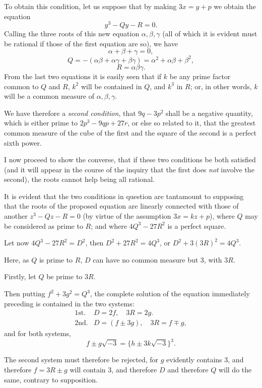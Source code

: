 \documentclass[11pt]{article}
\newcommand{\sourcepage}[1]{\marginpar{\scriptsize p.~#1}}
\begin{document}
To obtain this condition, let us suppose that by making $3x=y+p$ we obtain the equation
\[
y^3-Qy-R=0.
\]
Calling the three roots of this new equation $\alpha,\beta,\gamma$ (all of which it is evident must be rational if those of the first equation are so), we have
\[
\alpha+\beta+\gamma=0,
\]
\[
Q=-(\alpha\beta+\alpha\gamma+\beta\gamma)=\alpha^2+\alpha\beta+\beta^2,
\]
\[
R=\alpha\beta\gamma.
\]
From the last two equations it is easily seen that if $k$ be any prime factor common to $Q$ and $R$, $k^2$ will be contained in $Q$, and $k^3$ in $R$; or, in other words, $k$ will be a common measure of $\alpha,\beta,\gamma$.

We have therefore a \emph{second condition}, that $9q-3p^2$ shall be a negative quantity, which is either prime to $2p^3-9qp+27r$, or else so related to it, that the greatest common measure of the cube of the first and the square of the second is a perfect sixth power.

I now proceed to show the converse, that if these two conditions be both satisfied (and it will appear in the course of the inquiry that the first does \emph{not} involve the second), the roots cannot help being all rational.

It is evident that the two conditions in question are tantamount to supposing that the roots of the proposed equation are linearly connected with those of another $z^3-Qz-R=0$ (by virtue of the assumption $3x=kz+p$), where $Q$ may be considered as prime to $R$; and where $4Q^3-27R^2$ is a perfect square.

Let now $4Q^3-27R^2=D^2$, then $D^2+27R^2=4Q^3$, or $D^2+3(3R)^2=4Q^3$.

Here, as $Q$ is prime to $R$, $D$ can have no common measure but 3, with $3R$.

Firstly, let $Q$ be prime to $3R$.

Then putting $f^2+3g^2=Q^3$, the complete solution of the equation immediately preceding is contained in the two systems:
\[
\begin{array}{ll}
\text{1st.}&D=2f,\quad 3R=2g.\\
\text{2nd.}&D=(f\pm3g),\quad 3R=f\mp g,
\end{array}
\]
and for both systems,
\[
f\pm g\sqrt{-3}=\{h\pm3k\sqrt{-3}\}^3.
\]

\sourcepage{105}
The second system must therefore be rejected, for $g$ evidently contains 3, and therefore $f=3R\pm g$ will contain 3, and therefore $D$ and therefore $Q$ will do the same, contrary to supposition.
\end{document}
